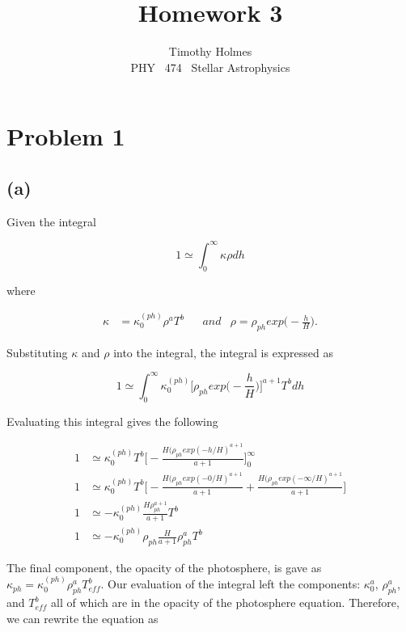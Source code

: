 \documentclass[11pt]{article}
\newcommand{\HWnum}{3}
\newcommand{\CourseNum}{474}           %
\newcommand{\Subject}{PHY}
\begin{document}

\title{Homework {\HWnum}}
\author{Timothy Holmes \\ \Subject ~ \CourseNum ~ Stellar Astrophysics}

\maketitle

\section*{Problem 1}

\subsection*{(a)}

Given the integral

$$
1 \simeq \int_{0}^{\infty} \kappa \rho dh
$$

where

\begin{align*}
    \kappa &= \kappa_{0}^{(ph)} \rho^{a} T^{b} && and & \rho = \rho_{ph}exp\Bigg(-\frac{h}{H}\Bigg).
\end{align*}

Substituting $\kappa$ and $\rho$ into the integral, the integral is expressed as

$$
1 \simeq \int_{0}^{\infty} \kappa_{0}^{(ph)} \Bigg[ \rho_{ph}exp\Bigg(-\frac{h}{H}\Bigg)\Bigg]^{a+1} T^{b} dh
$$

Evaluating this integral gives the following

\begin{align*}
    1 &\simeq  \kappa_{0}^{(ph)} T^{b} \Bigg[-\frac{H(\rho_{ph} exp(-h/H)^{a+1}}{a+1}\Bigg]_{0}^{\infty} \\
    1 &\simeq  \kappa_{0}^{(ph)} T^{b} \Bigg[-\frac{H(\rho_{ph} exp(-0/H)^{a+1}}{a+1} + \frac{H(\rho_{ph} exp(-\infty/H)^{a+1}}{a+1}\Bigg] \\
    1 &\simeq  -\kappa_{0}^{(ph)}  \frac{H\rho_{ph}^{a+1}}{a+1} T^{b} \\
    1 &\simeq  -\kappa_{0}^{(ph)}\rho_{ph} \frac{H}{a+1} \rho_{ph}^{a} T^{b}
\end{align*}

The final component, the opacity of the photosphere, is gave as $\kappa_{ph} = \kappa_{0}^{(ph)} \rho_{ph}^{a} T_{eff}^{b}$. Our evaluation of the integral left the components: $\kappa_{0}^{a}$, $\rho_{ph}^{a}$, and $T_{eff}^{b}$ all of which are in the opacity of the photosphere equation. Therefore, we can rewrite the equation as
\end{document}
